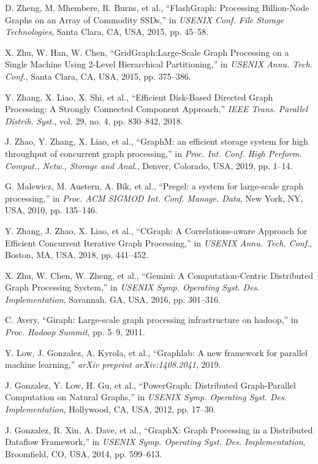 \documentclass[10pt,journal,compsoc]{IEEEtran}
\begin{document}
\begin{thebibliography}{100}
D. Zheng, M. Mhembere, R. Burns, et al., ``{FlashGraph}: Processing {Billion-Node} Graphs on an Array of Commodity {SSDs},'' in \textit{USENIX Conf. File Storage Technologies}, Santa Clara, CA, USA, 2015, pp. 45--58.

X. Zhu, W. Han, W. Chen, ``{GridGraph}:{Large-Scale} Graph Processing on a Single Machine Using 2-Level Hierarchical Partitioning,'' in \textit{USENIX Annu. Tech. Conf.}, Santa Clara, CA, USA, 2015, pp. 375--386.

Y. Zhang, X. Liao, X. Shi, et al., ``Efficient Disk-Based Directed Graph Processing: A Strongly Connected Component Approach,'' \textit{IEEE Trans. Parallel Distrib. Syst.}, vol. 29, no. 4, pp. 830--842, 2018.

J. Zhao, Y. Zhang, X. Liao, et al., ``GraphM: an efficient storage system for high throughput of concurrent graph processing,'' in \textit{Proc. Int. Conf. High Perform. Comput., Netw., Storage and Anal.}, Denver, Colorado, USA, 2019, pp. 1--14.

G. Malewicz, M. Austern, A. Bik, et al., ``Pregel: a system for large-scale graph processing,'' in \textit{Proc. ACM SIGMOD Int. Conf. Manage. Data}, New York, NY, USA, 2010, pp. 135--146.

Y. Zhang, J. Zhao, X. Liao, et al., ``{CGraph}: A Correlations-aware Approach for Efficient Concurrent Iterative Graph Processing,'' in \textit{USENIX Annu. Tech. Conf.}, Boston, MA, USA, 2018, pp. 441--452.

X. Zhu, W. Chen, W. Zheng, et al., ``Gemini: A {Computation-Centric} Distributed Graph Processing System,'' in \textit{USENIX Symp. Operating Syst. Des. Implementation}, Savannah, GA, USA, 2016, pp. 301--316.

C. Avery, ``Giraph: Large-scale graph processing infrastructure on hadoop,'' in \textit{Proc. Hadoop Summit}, pp. 5--9, 2011.

Y. Low, J. Gonzalez, A. Kyrola, et al., ``Graphlab: A new framework for parallel machine learning,'' \textit{arXiv preprint arXiv:1408.2041}, 2019.

J. Gonzalez, Y. Low, H. Gu, et al., ``{PowerGraph}: Distributed {Graph-Parallel} Computation on Natural Graphs,'' in \textit{USENIX Symp. Operating Syst. Des. Implementation}, Hollywood, CA, USA, 2012, pp. 17--30.

J. Gonzalez, R. Xin, A. Dave, et al., ``{GraphX}: Graph Processing in a Distributed Dataflow Framework,'' in \textit{USENIX Symp. Operating Syst. Des. Implementation}, Broomfield, CO, USA, 2014, pp. 599--613.



\end{thebibliography}
\end{document}
